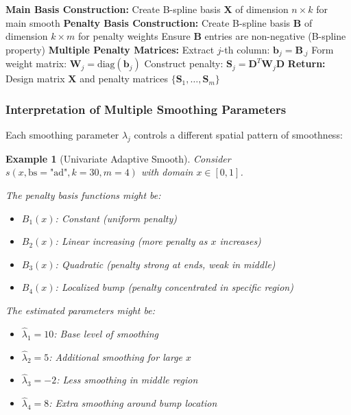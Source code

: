 \documentclass[12pt]{article}
\newtheorem{example}{Example}
\begin{document}
\begin{algorithm}
\caption{Adaptive Smooth Construction in mgcv}
\begin{algorithmic}[1]
\State \textbf{Main Basis Construction:}
\State Create B-spline basis $\mathbf{X}$ of dimension $n \times k$ for main smooth
\State 
\State \textbf{Penalty Basis Construction:}
\State Create B-spline basis $\mathbf{B}$ of dimension $k \times m$ for penalty weights
\State Ensure $\mathbf{B}$ entries are non-negative (B-spline property)
\State 
\State \textbf{Multiple Penalty Matrices:}
    \State Extract $j$-th column: $\mathbf{b}_j = \mathbf{B}_{.j}$
    \State Form weight matrix: $\mathbf{W}_j = \text{diag}(\mathbf{b}_j)$
    \State Construct penalty: $\mathbf{S}_j = \mathbf{D}^T \mathbf{W}_j \mathbf{D}$
\EndFor
\State 
\State \textbf{Return:} Design matrix $\mathbf{X}$ and penalty matrices $\{\mathbf{S}_1, \ldots, \mathbf{S}_m\}$
\end{algorithmic}
\end{algorithm}

\subsubsection{Interpretation of Multiple Smoothing Parameters}

Each smoothing parameter $\lambda_j$ controls a different spatial pattern of smoothness:

\begin{example}[Univariate Adaptive Smooth]
Consider $s(x, \text{bs}=\text{"ad"}, k=30, m=4)$ with domain $x \in [0,1]$.

The penalty basis functions might be:
\begin{itemize}
    \item $B_1(x)$: Constant (uniform penalty)
    \item $B_2(x)$: Linear increasing (more penalty as $x$ increases)
    \item $B_3(x)$: Quadratic (penalty strong at ends, weak in middle)
    \item $B_4(x)$: Localized bump (penalty concentrated in specific region)
\end{itemize}

The estimated parameters might be:
\begin{itemize}
    \item $\hat{\lambda}_1 = 10$: Base level of smoothing
    \item $\hat{\lambda}_2 = 5$: Additional smoothing for large $x$
    \item $\hat{\lambda}_3 = -2$: Less smoothing in middle region
    \item $\hat{\lambda}_4 = 8$: Extra smoothing around bump location
\end{itemize}
\end{example}
\end{document}
